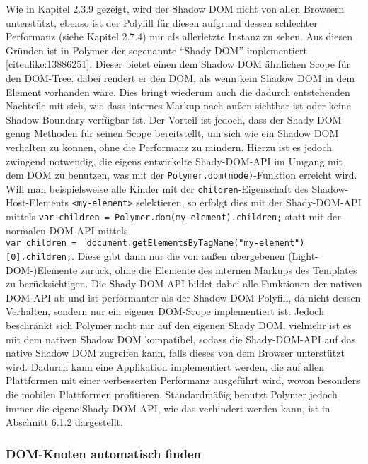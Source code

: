 \documentclass[]{article}
\begin{document}
Wie in Kapitel 2.3.9 gezeigt, wird der Shadow DOM nicht von allen
Browsern unterstützt, ebenso ist der Polyfill für diesen aufgrund dessen
schlechter Performanz (siehe Kapitel 2.7.4) nur als allerletzte Instanz
zu sehen. Aus diesen Gründen ist in Polymer der sogenannte ``Shady DOM''
implementiert {[}citeulike:13886251{]}. Dieser bietet einen dem Shadow
DOM ähnlichen Scope für den DOM-Tree. dabei rendert er den DOM, als wenn
kein Shadow DOM in dem Element vorhanden wäre. Dies bringt wiederum auch
die dadurch entstehenden Nachteile mit sich, wie dass internes Markup
nach außen sichtbar ist oder keine Shadow Boundary verfügbar ist. Der
Vorteil ist jedoch, dass der Shady DOM genug Methoden für seinen Scope
bereitstellt, um sich wie ein Shadow DOM verhalten zu können, ohne die
Performanz zu mindern. Hierzu ist es jedoch zwingend notwendig, die
eigens entwickelte Shady-DOM-API im Umgang mit dem DOM zu benutzen, was
mit der \texttt{Polymer.dom(node)}-Funktion erreicht wird. Will man
beispielsweise alle Kinder mit der \texttt{children}-Eigenschaft des
Shadow-Host-Elements \texttt{\textless{}my-element\textgreater{}}
selektieren, so erfolgt dies mit der Shady-DOM-API mittels
\texttt{var\ children\ =\ Polymer.dom(my-element).children;} statt mit
der normalen DOM-API mittels
\texttt{var\ children\ =\ \ document.getElementsByTagName("my-element"){[}0{]}.children;}.
Diese gibt dann nur die von außen übergebenen (Light-DOM-)Elemente
zurück, ohne die Elemente des internen Markups des Templates zu
berücksichtigen. Die Shady-DOM-API bildet dabei alle Funktionen der
nativen DOM-API ab und ist performanter als der Shadow-DOM-Polyfill, da
nicht dessen Verhalten, sondern nur ein eigener DOM-Scope implementiert
ist. Jedoch beschränkt sich Polymer nicht nur auf den eigenen Shady DOM,
vielmehr ist es mit dem nativen Shadow DOM kompatibel, sodass die
Shady-DOM-API auf das native Shadow DOM zugreifen kann, falls dieses von
dem Browser unterstützt wird. Dadurch kann eine Applikation
implementiert werden, die auf allen Plattformen mit einer verbesserten
Performanz ausgeführt wird, wovon besonders die mobilen Plattformen
profitieren. Standardmäßig benutzt Polymer jedoch immer die eigene
Shady-DOM-API, wie das verhindert werden kann, ist in Abschnitt 6.1.2
dargestellt.

\subsubsection{DOM-Knoten automatisch
finden}\label{dom-knoten-automatisch-finden}
\end{document}
